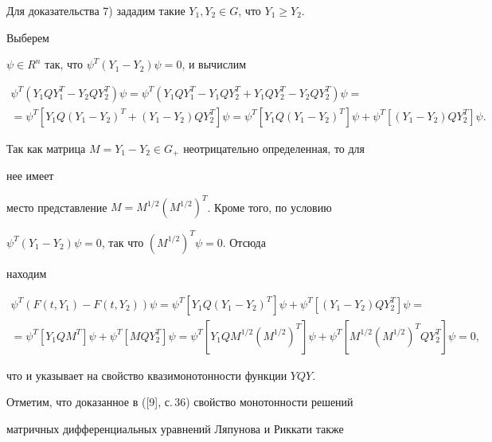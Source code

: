 {\begin{pf}
Для доказательства 7) зададим такие $Y_1,Y_2\in G$, что $Y_1\ge Y_2$. 


Выберем 


$\psi\in R^n$ так, что $\psi^T(Y_1-Y_2)\psi=0$, и вычислим 


\begin{multline*} 


\psi^T(Y_1 Q Y^T_1-Y_2 Q Y^T_2)\psi=\psi^T(Y_1 Q Y^T_1- 


Y_1 Q Y^T_2+Y_1 Q Y^T_2-Y_2 Q Y^T_2)\psi= \\ 


% 


=\psi^T[Y_1 Q(Y_1-Y_2)^T+(Y_1-Y_2)Q Y^T_2]\psi= 


\psi^T[Y_1 Q(Y_1-Y_2)^T]\psi+ 


\psi^T[(Y_1-Y_2)Q Y^T_2]\psi. 


\end{multline*} 


Так как матрица $M=Y_1-Y_2\in G_+$ неотрицательно определенная, то для 


нее имеет 


место представление $M=M^{1/2}(M^{1/2})^T$. Кроме того, по условию 


$\psi^T(Y_1-Y_2)\psi=0$, так что $(M^{1/2})^T\psi=0$. Отсюда 


находим 


\begin{multline*} 


\psi^T(F(t,Y_1)-F(t,Y_2))\psi=\psi^T[Y_1Q(Y_1-Y_2)^T]\psi 


+\psi^T[(Y_1-Y_2)Q Y^T_2]\psi=\\ 


% 


=\psi^T[Y_1Q M^T]\psi+\psi^T[M Q Y^T_2]\psi= 


\psi^T[Y_1 Q M^{1/2}(M^{1/2})^T]\psi+ 


\psi^T[M^{1/2}(M^{1/2})^T Q Y^T_2]\psi=0, 


\end{multline*} 


что и указывает на свойство квазимонотонности функции $Y Q Y$. 


\end{pf} 


 


Отметим, что доказанное в ([9], с.\,36) свойство монотонности решений 


матричных дифференциальных уравнений Ляпунова и Риккати также 


}
